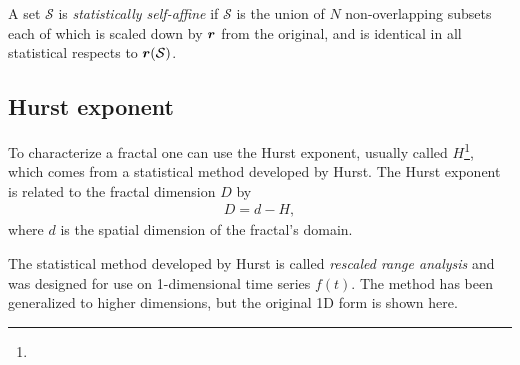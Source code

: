 A set $\mathcal{S}$ is \emph{statistically self-affine} if $\mathcal{S}$ is the union of $N$ non-overlapping subsets each of which is scaled down by $\bm{r}$ from the original, and is identical in all statistical respects to $\bm{r}(\mathcal{S})$.

\subsection{Hurst exponent}

To characterize a fractal one can use the Hurst exponent, usually called $H$\footnote{}, which comes from a statistical method developed by Hurst\cite{hurst1965longterm}\cite{hurst1951longterm}. The Hurst exponent is related to the fractal dimension $D$ by
\begin{align*}
    D = d-H,
\end{align*}
where $d$ is the spatial dimension of the fractal's domain\cite{feder1988fractals}.

The statistical method developed by Hurst is called \emph{rescaled range analysis} and was designed for use on 1-dimensional time series $f(t)$. The method has been generalized to higher dimensions\cite{fan2013rescaled}, but the original 1D form is shown here.

